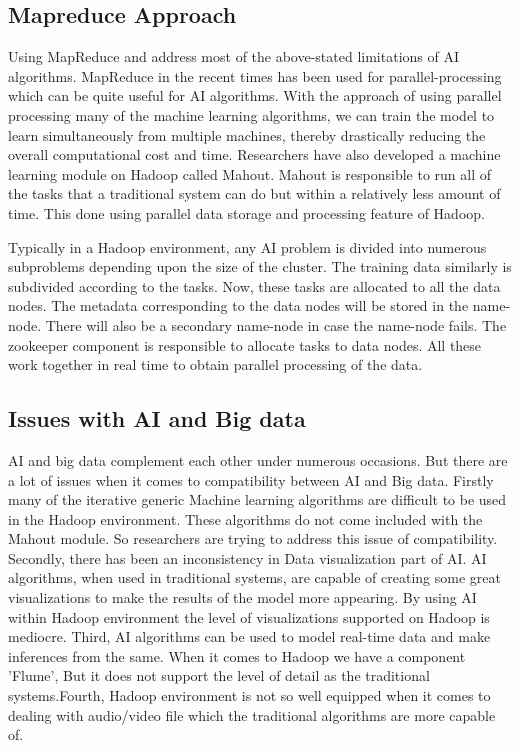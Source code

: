 \documentclass[sigconf]{acmart}
\begin{document}
\subsection{Mapreduce Approach}

Using MapReduce and address most of the above-stated limitations of AI algorithms. MapReduce in the recent times has been used for parallel-processing which can be quite useful for AI algorithms. With the approach of using parallel processing many of the machine learning algorithms, we can train the model to learn simultaneously from multiple machines, thereby drastically reducing the overall computational cost and time. Researchers have also developed a machine learning module on Hadoop called Mahout. Mahout is responsible to run all of the tasks that a traditional system can do but within a relatively less amount of time. This done using parallel data storage and processing feature of Hadoop.\cite{OLeary}


Typically in a Hadoop environment, any AI problem is divided into numerous subproblems depending upon the size of the cluster. The training data similarly is subdivided according to the tasks. Now, these tasks are allocated to all the data nodes. The metadata corresponding to the data nodes will be stored in the name-node. There will also be a secondary name-node in case the name-node fails. The zookeeper component is responsible to allocate tasks to data nodes. All these work together in real time to obtain parallel processing of the data. \cite{OLeary}

\subsection{Issues with AI and Big data}

AI and big data complement each other under numerous occasions. But there are a lot of issues when it comes to compatibility between AI and Big data. Firstly many of the iterative generic Machine learning algorithms are difficult to be used in the Hadoop environment. These algorithms do not come included with the Mahout module. So researchers are trying to address this issue of compatibility. Secondly, there has been an inconsistency in Data visualization part of AI. AI algorithms, when used in traditional systems, are capable of creating some great visualizations to make the results of the model more appearing. By using AI within Hadoop environment the level of visualizations supported on Hadoop is mediocre. Third, AI algorithms can be used to model real-time data and make inferences from the same. When it comes to Hadoop we have a component 'Flume', But it does not support the level of detail as the traditional systems.Fourth, Hadoop environment is not so well equipped when it comes to dealing with audio/video file which the traditional algorithms are more capable of. \cite{OLeary}
\end{document}
